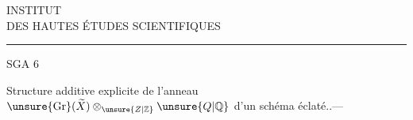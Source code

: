 \begin{center}
INSTITUT\\
DES HAUTES ÉTUDES SCIENTIFIQUES\\[-.4ex]
\rule{1.4cm}{.4pt}
\end{center}

SGA 6

Structure additive explicite
de l'anneau $\unsure{\mathrm{Gr}}(\widetilde X)\otimes_{\unsure{Z|\mathbb Z}}\unsure{Q|\mathbb Q}$ d'un
schéma éclaté..---

